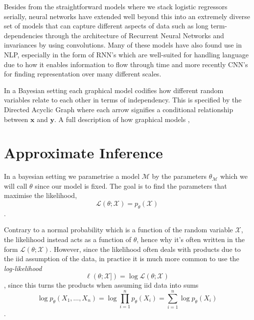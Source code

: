 Besides from the straightforward models where we stack logistic regressors
serially, neural networks have extended well beyond this into an extremely
diverse set of models that can capture different aspects of data such as long
term-dependencies through the architecture of Recurrent Neural Networks and
invariances by using convolutions. Many of these models have also found use in
NLP, especially in the form of RNN's which are well-suited for handling
language due to how it enables information to flow through
time\cite{graves_generating_2013}\cite{cho_learning_2014} and more recently
CNN's for finding representation over many different
scales\cite{semeniuta_hybrid_2017}\cite{yang_improved_2017}\cite{gehring_convolutional_2016}.

In a Bayesian setting each graphical model codifies how different random variables relate
to each other in terms of independency. This is specified by the Directed
Acyclic Graph where each arrow signifies a conditional relationship between
$\bm{x}$ and $\bm{y}$. A full description of how graphical models ,

\section{Approximate Inference}

In a bayesian setting we parametrise a model $\mathcal{M}$ by the parameters
$\theta_{\mathcal{M}}$ which we will call $\theta$ since our model is fixed. The
goal is to find the parameters that maximise the likelihood,
\begin{equation}
  \label{eq:likelihood}
  \mathcal{L}(\theta; \mathcal{X}) = p_{\theta}(\mathcal{X})
\end{equation}.

Contrary to a normal probability which is a function of the random variable
$\mathcal{X}$, the likelihood instead acts as a function of $\theta$, hence why
it's often written in the form $\mathcal{L}(\theta; \mathcal{X})$. However,
since the likelihood often deals with products due to the iid assumption of the
data, in practice it is much more common to use the \textit{log-likelihood}
\begin{equation}
  \label{eq:log_likelihood}
  \ell(\theta; \mathcal{X]}) = \log \mathcal{L}(\theta; \mathcal{X})
\end{equation},
since this turns the products when assuming iid data into sums
\begin{equation*}
  \log p_{\theta}(X_1, \dots, X_n) = \log \prod_{i = 1}^n p_{\theta}(X_i) = \sum_{i = 1}^n \log p_{\theta}(X_i)
\end{equation*}.

